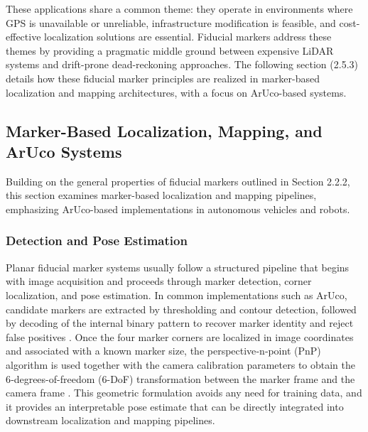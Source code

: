 These applications share a common theme: they operate in environments where GPS is unavailable or unreliable, infrastructure modification is feasible, and cost-effective localization solutions are essential. Fiducial markers address these themes by providing a pragmatic middle ground between expensive LiDAR systems and drift-prone dead-reckoning approaches. The following section (2.5.3) details how these fiducial marker principles are realized in marker-based localization and mapping architectures, with a focus on ArUco-based systems.

\subsection{Marker-Based Localization, Mapping, and ArUco Systems}
Building on the general properties of fiducial markers outlined in Section 2.2.2, this section examines marker-based localization and mapping pipelines, emphasizing ArUco-based implementations in autonomous vehicles and robots.

\subsubsection{Detection and Pose Estimation}
Planar fiducial marker systems usually follow a structured pipeline that begins with image acquisition and proceeds through marker detection, corner localization, and pose estimation. In common implementations such as ArUco, candidate markers are extracted by thresholding and contour detection, followed by decoding of the internal binary pattern to recover marker identity and reject false positives \citep{Rosebrock2024ArucoPyImageSearch}. Once the four marker corners are localized in image coordinates and associated with a known marker size, the perspective‑n‑point (PnP) algorithm is used together with the camera calibration parameters to obtain the 6‑degrees-of-freedom (6-DoF) transformation between the marker frame and the camera frame \citep{Braun2022RobotAtFactoryLocalization, Fang2020MarkerValetParking}. This geometric formulation avoids any need for training data, and it provides an interpretable pose estimate that can be directly integrated into downstream localization and mapping pipelines.

